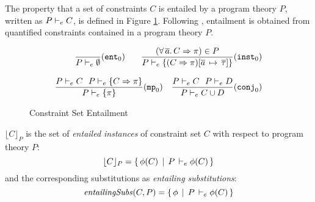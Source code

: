 \vspace*{-.5\baselineskip}
The property that a set of constraints $C$ is entailed by a program
theory $P$, written as $P \vdash_e C$, is defined in Figure
\ref{Entailment-fig}.  Following
\cite{Associated-types-with-class,Associated-type-synonyms},
entailment is obtained from quantified constraints contained in a program
theory $P$.


\begin{figure}
   \[ \begin{array}{r}
         \begin{array}{cr}
   		\displaystyle\frac{}{P \vdash_e \emptyset} (\texttt{ent}_0)\hspace*{.3cm} &
		\displaystyle\frac
                        {(\forall\,\overline{a}.\,C\Rightarrow \pi) \in P}
			{P \vdash_e \{ (C\Rightarrow\pi)[\overline{a}\,\mapsto\,\overline{\tau}] \} }
			(\texttt{inst}_0)
         \end{array}\\ \\
         \begin{array}{cr}
		\displaystyle\frac
			{P \vdash_e C \:\:\: P \vdash_e \{C\Rightarrow\pi\} }
			{P \vdash_e \{ \pi \}} (\texttt{mp}_0)
			&
		\displaystyle\frac
			{P \vdash_e C \:\:\: P \vdash_e D}
			{P \vdash_e C \cup D} (\texttt{conj}_0)
	 \end{array}
       \end{array}
   \]
\caption{Constraint Set Entailment}
\label{Entailment-fig}
\end{figure}

\begin{Definition}

  \normalfont
  
$\lfloor C \rfloor_P$ is the set of {\em entailed instances\/} of constraint set
$C$ with respect to program theory $P$:
\[ \lfloor C \rfloor_P = \{\,\phi(C) \,\mid\, P\, \vdash_e \phi(C)\, \} \]
and the corresponding substitutions as {\em entailing substitutions\/}:
  \[ \mathit{entailingSubs\/}(C,P) = \{\,\phi \,\mid\, P\, \vdash_e \phi(C)\, \} \]


\end{Definition}

